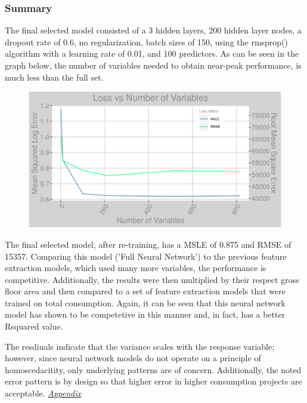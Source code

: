 \subsubsection{Summary}
The final selected model consisted of a 3 hidden layers, 200 hidden layer nodes, a dropout rate of 0.6, no regularization, batch sizes of 150, using the rmsprop() algorithm with a learning rate of 0.01, and 100 predictors.  As can be seen in the graph below, the number of variables needed to obtain near-peak performance, is much less than the full set.

\begin{figure}[h]
\centering
\includegraphics[width=\textwidth, height=0.25\textheight]{Images/electricity_psf_nn_error.png}
\end{figure}

The final selected model, after re-training, has a MSLE of 0.875 and RMSE of 15357.  Comparing this model ('Full Neural Network') to the previous feature extraction models, which used many more variables, the performance is competitive.  Additionally, the results were then multiplied by their respect gross floor area and then compared to a set of feature extraction models that were trained on total consumption.  Again, it can be seen that this neural network model has shown to be competetive in this manner and, in fact, has a better Rsquared value.

The resdiuals indicate that the variance scales with the response variable; however, since neural network models do not operate on a principle of homoscedacitity, only underlying patterns are of concern. Additionally, the noted error pattern is by design so that higher error in higher consumption projects are acceptable.  \textit{\hyperref[appendix_nn:electricity:nn_full]{Appendix}}


